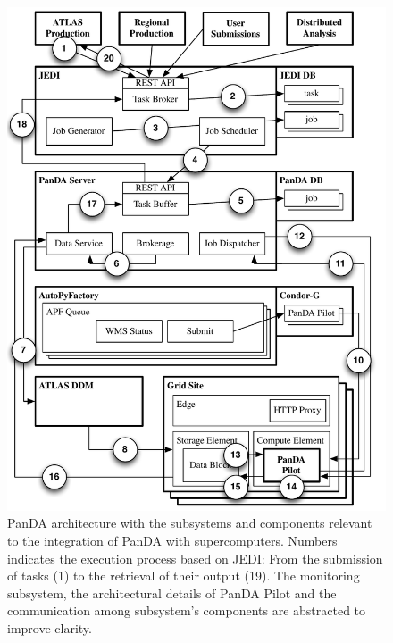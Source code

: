 \begin{figure}
  \begin{center}
    \includegraphics[width=\columnwidth]{figures/panda_architecture.pdf}
  \end{center}
    \caption{PanDA architecture with the subsystems and components
    relevant to the integration of PanDA with supercomputers. Numbers indicates
    the execution process based on JEDI: From the submission of tasks (1) to the
    retrieval of their output (19). The monitoring subsystem, the architectural
    details of PanDA Pilot and the communication among subsystem's components
    are abstracted to improve clarity.}
\label{fig:architecture}
\end{figure}


